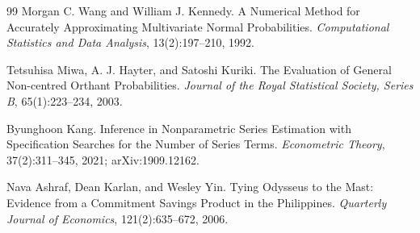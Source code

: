 \documentclass{article}
\begin{document}
\begin{thebibliography}{99}
   Morgan C. Wang and William J. Kennedy. A Numerical Method for Accurately Approximating Multivariate Normal Probabilities. \emph{Computational Statistics and Data Analysis}, 13(2):197--210, 1992.

   Tetsuhisa Miwa, A. J. Hayter, and Satoshi Kuriki. The Evaluation of General Non-centred Orthant Probabilities. \emph{Journal of the Royal Statistical Society, Series B}, 65(1):223--234, 2003.

   Byunghoon Kang. Inference in Nonparametric Series Estimation with Specification Searches for the Number of Series Terms. \emph{Econometric Theory}, 37(2):311--345, 2021; arXiv:1909.12162.

   Nava Ashraf, Dean Karlan, and Wesley Yin. Tying Odysseus to the Mast: Evidence from a Commitment Savings Product in the Philippines. \emph{Quarterly Journal of Economics}, 121(2):635--672, 2006.

\end{thebibliography}
\end{document}
